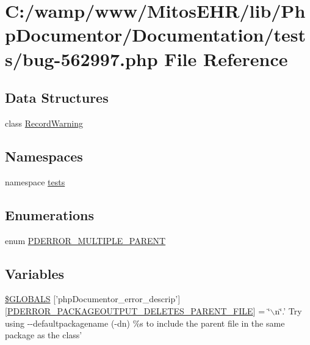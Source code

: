 \hypertarget{bug-562997_8php}{\section{\-C\-:/wamp/www/\-Mitos\-E\-H\-R/lib/\-Php\-Documentor/\-Documentation/tests/bug-\/562997.php \-File \-Reference}
\label{bug-562997_8php}
}
\subsection*{\-Data \-Structures}
\begin{DoxyCompactItemize}
\item 
class \hyperlink{class_record_warning}{\-Record\-Warning}
\end{DoxyCompactItemize}
\subsection*{\-Namespaces}
\begin{DoxyCompactItemize}
\item 
namespace \hyperlink{namespacetests}{tests}
\end{DoxyCompactItemize}
\subsection*{\-Enumerations}
\begin{DoxyCompactItemize}
\item 
enum \hyperlink{bug-562997_8php_aa4067eef2227b444cee399368374b6cf}{\-P\-D\-E\-R\-R\-O\-R\-\_\-\-M\-U\-L\-T\-I\-P\-L\-E\-\_\-\-P\-A\-R\-E\-N\-T} 
\end{DoxyCompactItemize}
\subsection*{\-Variables}
\begin{DoxyCompactItemize}
\item 
\hyperlink{bug-562997_8php_aaa6a277368deecb0948f5287d6e05ba3}{\$\-G\-L\-O\-B\-A\-L\-S} \mbox{[}'php\-Documentor\-\_\-error\-\_\-descrip'\mbox{]}\mbox{[}\hyperlink{_errors_8inc_acec66b09025d8fe33d0e04a275535b3a}{\-P\-D\-E\-R\-R\-O\-R\-\_\-\-P\-A\-C\-K\-A\-G\-E\-O\-U\-T\-P\-U\-T\-\_\-\-D\-E\-L\-E\-T\-E\-S\-\_\-\-P\-A\-R\-E\-N\-T\-\_\-\-F\-I\-L\-E}\mbox{]} = \char`\"{}$\backslash$n\char`\"{}.' \-Try using -\/-\/defaultpackagename (-\/dn) \%s to include the parent file in the same package as the class'
\end{DoxyCompactItemize}


